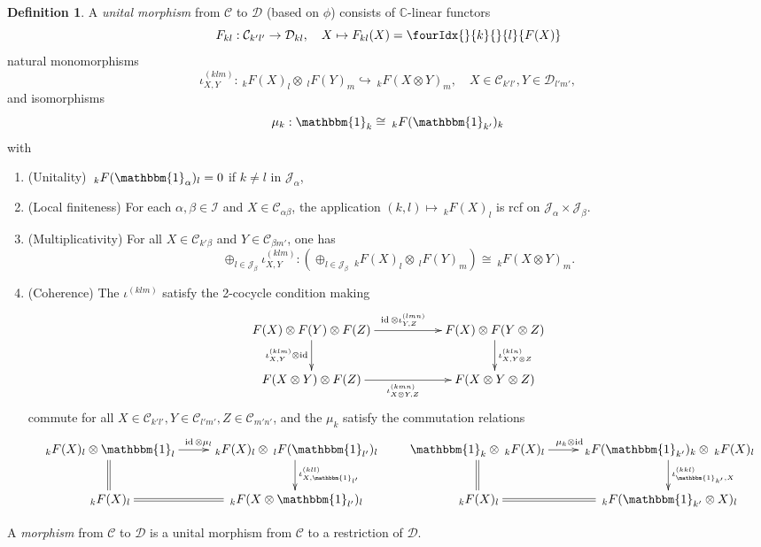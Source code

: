 \documentclass[10pt]{article}
\DeclareMathOperator{\id}{id}
\newcommand{\C}{\mathbb{C}}
\newcommand{\CatC}{\mathcal{C}}
\newcommand{\CatD}{\mathcal{D}}
\newcommand{\CatCC}{\mathscr{C}}
\newcommand{\CatDD}{\mathscr{D}}
\newcommand{\GrDA}[3]{{}_{\;#2}#1_{#3}} %
\newcommand{\Unitb}{\mathbbm{1}}
\newcommand{\Gr}[5]{\fourIdx{#2}{#4}{#3}{#5}{#1}}%
\newcommand{\Gru}[3]{\Gr{#1}{}{}{#2}{#3}}
\theoremstyle{definition}
\newtheorem{Def}[Theorem]{Definition}
\numberwithin{equation}{section}
\begin{document}
\begin{Def}
A \emph{unital morphism} from $\CatCC$ to $\CatDD$ (based on $\phi$) consists of $\C$-linear functors \[F_{kl}: \CatC_{k'l'}\rightarrow \CatD_{kl},\quad X\mapsto F_{kl}(X) = \Gru{F(X)}{k}{l}\] natural monomorphisms \[\iota^{(klm)}_{X,Y}: \GrDA{F(X)}{k}{l} \otimes \GrDA{F(Y)}{l}{m} \hookrightarrow \GrDA{F(X\otimes Y)}{k}{m}, \quad X\in \CatC_{k'l'},Y\in \CatD_{l'm'},\] and isomorphisms \[\mu_{k}:  \Unitb_k \cong \GrDA{F(\Unitb_{k'})}{k}{k}\] with \begin{enumerate}[label=(\arabic*)]
\item (Unitality)  $\GrDA{F(\Unitb_{\alpha})}{k}{l}= 0$ if $k\neq l$ in $\mathscr{J}_\alpha$,
\item (Local finiteness) For each $\alpha,\beta\in \mathscr{I}$ and $X\in \CatC_{\alpha\beta}$, the application $(k,l)\mapsto \GrDA{F(X)}{k}{l}$ is rcf on $\mathscr{J}_{\alpha}\times \mathscr{J}_{\beta}$. 
\item (Multiplicativity) For all $X\in \CatC_{k'\beta}$ and $Y\in \CatC_{\beta m'}$, one has\[\oplus_{l\in \mathscr{J}_\beta} \iota^{(klm)}_{X,Y}: \left(\oplus_{l\in \mathscr{J}_\beta} \GrDA{F(X)}{k}{l} \otimes \GrDA{F(Y)}{l}{m}\right) \cong \GrDA{F(X\otimes Y)}{k}{m}.\]
\item (Coherence) The $\iota^{(klm)}$ satisfy the 2-cocycle condition making \[\xymatrix{F(X)\otimes F(Y)\otimes F(Z) \ar[rr]^{\id\otimes \iota^{(lmn)}_{Y,Z}} \ar[d]_{\iota^{(klm)}_{X,Y}\otimes\id}&& F(X)\otimes F(Y\otimes Z)\ar[d]^{\iota^{(kln)}_{X,Y\otimes Z}}\\ F(X\otimes Y)\otimes F(Z) \ar[rr]_{\iota^{(kmn)}_{X\otimes Y,Z}}&& F(X\otimes Y \otimes Z)}\] commute for all $X\in \CatC_{k'l'},Y\in \CatC_{l'm'}, Z\in \CatC_{m'n'}$, and the $\mu_k$ satisfy the commutation relations \[\xymatrix{ \GrDA{F(X)}{k}{l}\otimes \Unitb_l \ar[r]^{\!\!\!\!\id\otimes \mu_l} \ar@{=}[d] & \GrDA{F(X)}{k}{l} \otimes \GrDA{F(\Unitb_{l'})}{l}{l} \ar[d]^{\iota^{(kll)}_{X, \Unitb_{l'}}} \\ \GrDA{F(X)}{k}{l} & \ar@{=}[l] \GrDA{F(X\otimes \Unitb_{l'})}{k}{l}} \qquad \xymatrix{  \Unitb_k\otimes \GrDA{F(X)}{k}{l}\ar[r]^{\!\!\!\!\mu_k\otimes \id} \ar@{=}[d] & \GrDA{F(\Unitb_{k'})}{k}{k} \otimes \GrDA{F(X)}{k}{l} \ar[d]^{\iota^{(kkl)}_{\Unitb_{k'},X}} \\ \GrDA{F(X)}{k}{l} & \ar@{=}[l] \GrDA{ F(\Unitb_{k'}\otimes X)}{k}{l}} \]
\end{enumerate}

A \emph{morphism} from $\CatCC$ to $\CatDD$ is a unital morphism from $\CatCC$ to a restriction of $\CatDD$. 
\end{Def}
\end{document}
